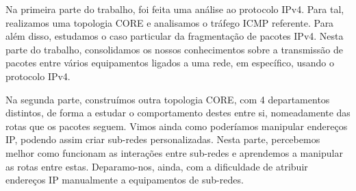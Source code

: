 \documentclass[11pt]{article}
\begin{document}
Na primeira parte do trabalho, foi feita uma análise ao protocolo IPv4. Para tal, realizamos uma topologia CORE e analisamos o tráfego ICMP referente. Para além disso, estudamos o caso particular da fragmentação de pacotes IPv4. Nesta parte do trabalho, consolidamos os nossos conhecimentos sobre a transmissão de pacotes entre vários equipamentos ligados a uma rede, em específico, usando o protocolo IPv4.

Na segunda parte, construímos outra topologia CORE, com 4 departamentos distintos, de forma a estudar o comportamento destes entre si, nomeadamente das rotas que os pacotes seguem. Vimos ainda como poderíamos manipular endereços IP, podendo assim criar sub-redes personalizadas. Nesta parte, percebemos melhor como funcionam as interações entre sub-redes e aprendemos a manipular as rotas entre estas. Deparamo-nos, ainda, com a dificuldade de atribuir endereços IP manualmente a equipamentos de sub-redes.
\end{document}
